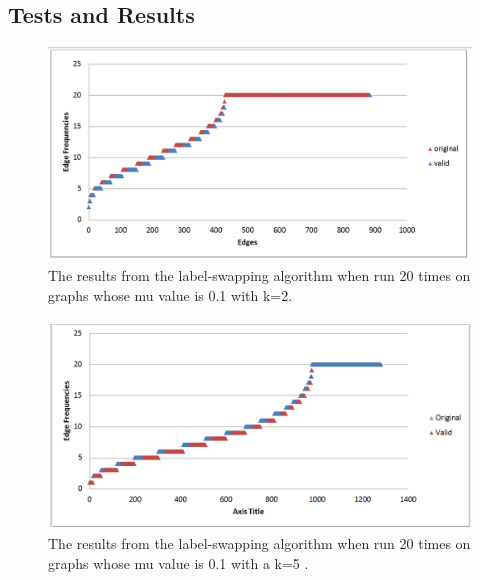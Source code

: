 \subsection{Tests and Results}

\begin{figure}[ht]
  \centering
  \includegraphics[scale=0.4 ]{mu=0_1 k=2 label.png}
  \caption{The results from the label-swapping algorithm when run 20 times on graphs whose mu value is 0.1 with k=2.}
  \label{fig:k=2 label-swap}
\end{figure}

\begin{figure}[ht]
  \centering
  \includegraphics[scale=0.4 ]{mu=0_1 k=5 label.png}
  \caption{The results from the label-swapping algorithm when run 20 times on graphs whose mu value is 0.1 with a k=5 .}
  \label{fig:k=5 label-swap}
\end{figure}